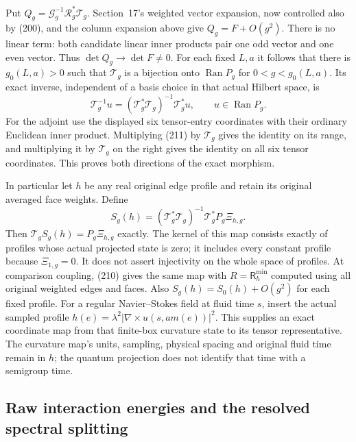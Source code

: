 \documentclass[11pt]{article}
\begin{document}
Put
$Q_g=\mathcal G_g^{-1}\mathcal R_g^*\mathcal T_g$.
Section~17's weighted vector expansion, now controlled also by
(200), and the column expansion above give
$Q_g=F+O(g^2)$. There is no linear term: both candidate linear
inner products pair one odd vector and one even vector. Thus
$\det Q_g\to\det F\ne0$. For each fixed $L,a$ it follows that
there is $g_0(L,a)>0$ such that $\mathcal T_g$ is a bijection
onto $\operatorname{Ran}P_g$ for $0<g<g_0(L,a)$.
Its exact inverse, independent of a basis choice in that actual
Hilbert space, is
\begin{equation}\label{eq:band-exact-inverse}
 \mathcal T_g^{-1}u=(\mathcal T_g^*\mathcal T_g)^{-1}
                              \mathcal T_g^*u,\qquad u\in\operatorname{Ran}P_g.
\end{equation}
For the adjoint use the displayed six tensor-entry coordinates with
their ordinary Euclidean inner product. Multiplying (211)
by $\mathcal T_g$ gives the identity on its range, and multiplying
it by $\mathcal T_g$ on the right gives the identity on all six
tensor coordinates. This proves both directions of the exact morphism.

In particular let $h$ be any real original edge profile and retain its
original averaged face weights. Define
\begin{equation}\label{eq:band-h-tensor}
 S_g(h)=(\mathcal T_g^*\mathcal T_g)^{-1}\mathcal T_g^*
                                   P_g\Xi_{h,g}.
\end{equation}
Then $\mathcal T_gS_g(h)=P_g\Xi_{h,g}$ exactly. The kernel of this
map consists exactly of profiles whose actual projected state is zero;
it includes every constant profile because $\Xi_{1,g}=0$.
It does not assert injectivity on the whole space of profiles.
At comparison coupling, (210) gives the same map
with $R=\mathsf R_h^{\min}$ computed using all original weighted
edges and faces. Also $S_g(h)=S_0(h)+O(g^2)$ for each fixed profile.
For a regular Navier--Stokes field at fluid time $s$, insert the
actual sampled profile $h(e)=\lambda^2|\nabla\times u(s,a m(e))|^2$.
This supplies an exact coordinate map from that finite-box curvature
state to its tensor representative. The curvature map's units,
sampling, physical spacing and original fluid time remain in $h$;
the quantum projection does not identify that time with a semigroup time.

\subsection{Raw interaction energies and the resolved spectral splitting}
\end{document}
